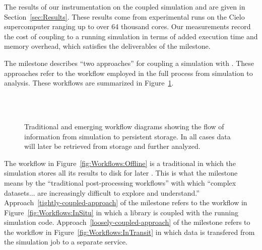 The results of our instrumentation on the coupled simulation and \vda are
given in Section~\ref{sec:Results}.  These results come from experimental
runs on the Cielo supercomputer ranging up to over 64
thousand cores.  Our measurements record the cost of coupling \vda to a
running simulation in terms of added execution time and memory overhead,
which satisfies the deliverables of the milestone.

The milestone describes ``two approaches'' for coupling a simulation with
\vda.  These approaches refer to the workflow employed in the full process
from simulation to analysis.  These workflows are summarized in
Figure~\ref{fig:Workflows}.

\begin{figure}
  \centering
   \\
   \\
  \caption[Visualization and data analysis workflows.]{Traditional and
    emerging workflow diagrams showing the flow of information from
    simulation to persistent storage.  In all cases data will later be
    retrieved from storage and further analyzed.}
  \label{fig:Workflows}
\end{figure}

The workflow in Figure~\ref{fig:Workflows:Offline} is a traditional
 in which the simulation stores all its
results to disk for later \vda.  This is what the milestone means by the
``traditional post-processing workflows'' with which ``complex
datasets... are increasingly difficult to explore and understand.''
Approach~\ref{tightly-coupled-approach} of the milestone refers to the
 workflow in Figure~\ref{fig:Workflows:InSitu} in
which a \vda library is coupled with the running simulation code.
Approach~\ref{loosely-coupled-approach} of the milestone refers to the
\keyterm{\intransit} workflow in Figure~\ref{fig:Workflows:InTransit} in
which data is transfered from the simulation job to a separate \vda
service.

